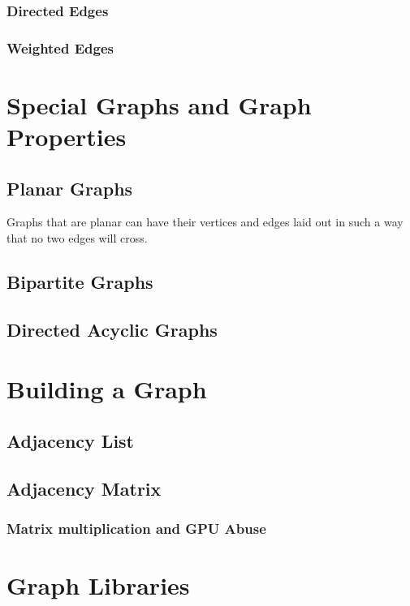 \subsubsection{Directed Edges}

\subsubsection{Weighted Edges}


\section{Special Graphs and Graph Properties}

\subsection{Planar Graphs}
Graphs that are planar can have their vertices and edges laid out in such a way that no two edges will cross.



\subsection{Bipartite Graphs}

\subsection{Directed Acyclic Graphs}


\section{Building a Graph}

\subsection{Adjacency List}
\subsection{Adjacency Matrix}
\subsubsection{Matrix multiplication and GPU Abuse}

\section{Graph Libraries}


